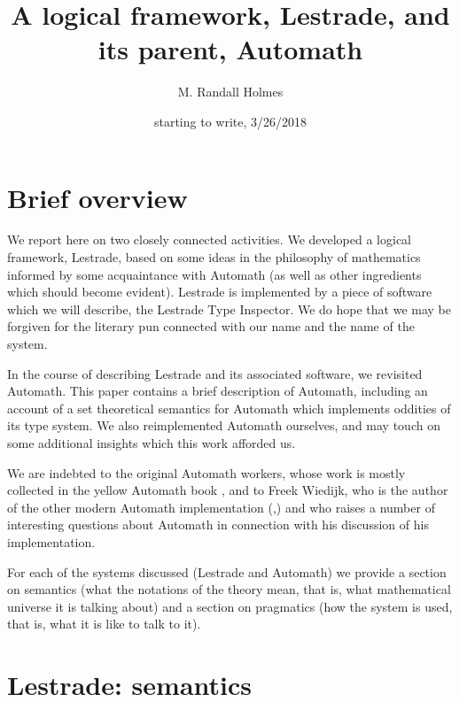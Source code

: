 \documentclass{article}
\title{A logical framework, Lestrade, and its parent, Automath}
\author{M. Randall Holmes}
\date{starting to write, 3/26/2018}
\begin{document}
\maketitle

\section{Brief overview}

We report here on two closely connected activities.  We developed a logical framework, Lestrade, based on some ideas in the philosophy of mathematics informed by some acquaintance with Automath (as well as other ingredients which should become evident).  Lestrade is implemented by a piece of software which we will describe, the Lestrade Type Inspector.  We do hope that we may be forgiven for the literary pun connected with our name and the name of the system.

In the course of describing Lestrade and its associated software, we revisited Automath.  This paper contains a brief description of Automath, including an account of a set theoretical semantics for Automath which implements oddities of its type system.  We also reimplemented Automath ourselves, and may touch on  some additional insights which this work afforded us.

We are indebted to the original Automath workers, whose work is mostly collected in the yellow Automath book \cite{yellowbook}, and to Freek Wiedijk, who is the  author of the other modern Automath implementation (\cite{autmanual},\cite{autpaper}) and who raises a number of interesting questions about Automath in connection with his discussion of his implementation.

For each of the systems discussed (Lestrade and Automath) we provide a section on semantics (what the notations of the theory mean, that is, what mathematical universe it is talking about) and a section on pragmatics (how the system is used, that is, what it is like to talk to it).

\newpage

\section{Lestrade:  semantics}
\end{document}
